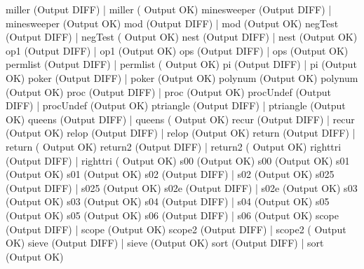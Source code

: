 \documentclass[12pt]{book}
\begin{document}
miller (Output DIFF)                                      |    miller (
Output OK)
minesweeper (Output DIFF)                                  |    minesweeper 
(Output OK)
mod (Output DIFF)                                      |    mod (Output OK)
negTest (Output DIFF)                                      |    negTest (
Output OK)
nest (Output DIFF)                                      |    nest (Output OK)
op1 (Output DIFF)                                      |    op1 (Output OK)
ops (Output DIFF)                                      |    ops (Output OK)
permlist (Output DIFF)                                      |    permlist (
Output OK)
pi (Output DIFF)                                      |    pi (Output OK)
poker (Output DIFF)                                      |    poker (Output 
OK)
polynum (Output OK)                                    polynum (Output OK)
proc (Output DIFF)                                      |    proc (Output OK)
procUndef (Output DIFF)                                      |    procUndef 
(Output OK)
ptriangle (Output DIFF)                                      |    ptriangle 
(Output OK)
queens (Output DIFF)                                      |    queens (
Output OK)
recur (Output DIFF)                                      |    recur (Output 
OK)
relop (Output DIFF)                                      |    relop (Output 
OK)
return (Output DIFF)                                      |    return (
Output OK)
return2 (Output DIFF)                                      |    return2 (
Output OK)
righttri (Output DIFF)                                      |    righttri (
Output OK)
s00 (Output OK)                                        s00 (Output OK)
s01 (Output OK)                                        s01 (Output OK)
s02 (Output DIFF)                                      |    s02 (Output OK)
s025 (Output DIFF)                                      |    s025 (Output OK)
s02e (Output DIFF)                                      |    s02e (Output OK)
s03 (Output OK)                                        s03 (Output OK)
s04 (Output DIFF)                                      |    s04 (Output OK)
s05 (Output OK)                                        s05 (Output OK)
s06 (Output DIFF)                                      |    s06 (Output OK)
scope (Output DIFF)                                      |    scope (Output 
OK)
scope2 (Output DIFF)                                      |    scope2 (
Output OK)
sieve (Output DIFF)                                      |    sieve (Output 
OK)
sort (Output DIFF)                                      |    sort (Output OK)
\end{document}
